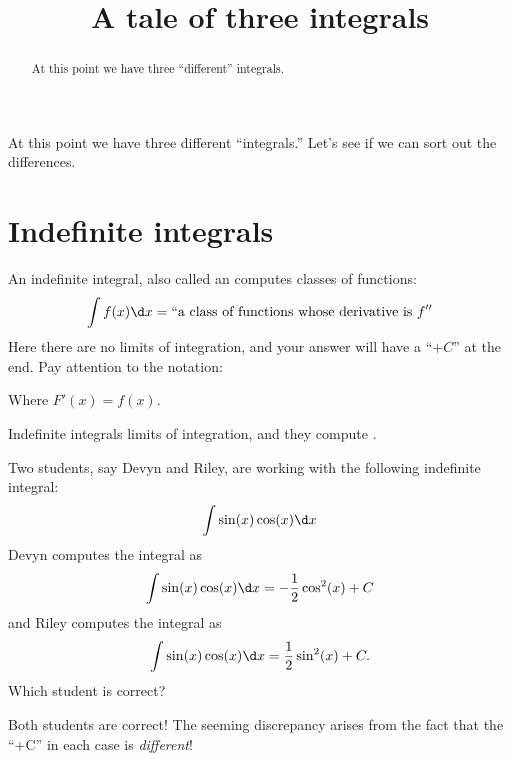 \documentclass{ximera}
\title[Dig-In:]{A tale of three integrals}
\begin{document}
\begin{abstract}
  At this point we have three ``different'' integrals. 
\end{abstract}
\maketitle

At this point we have three different ``integrals.'' Let's see if we
can sort out the differences.

\section{Indefinite integrals}

An indefinite integral, also called an  computes
classes of functions:
\[
\int f(x) \d x = ``\text{a class of functions whose derivative is $f$}''
\]
Here there are no limits of integration, and your answer will have a
``$+C$'' at the end. Pay attention to the notation:
\begin{image}
\end{image}
Where $F'(x) = f(x)$.
\begin{explanation}%
  Indefinite integrals
   limits of
  integration, and they compute .
\end{explanation}

\begin{question}
  Two students, say Devyn and Riley, are working with the following
  indefinite integral:
  \[
  \int \sin(x)\cos(x)\d x
  \]
  Devyn computes the integral as
  \[
  \int \sin(x)\cos(x)\d x = -\frac{1}{2}\cos^2(x) + C
  \]
  and Riley computes the integral as
  \[
  \int \sin(x)\cos(x)\d x = \frac{1}{2}\sin^2(x) + C.
  \]
  Which student is correct?
  \begin{multipleChoice}
  \end{multipleChoice}
  \begin{feedback}
    Both students are correct! The seeming discrepancy arises from the
    fact that the ``+C'' in each case is \textit{different}!
  \end{feedback}
\end{question}
\end{document}

